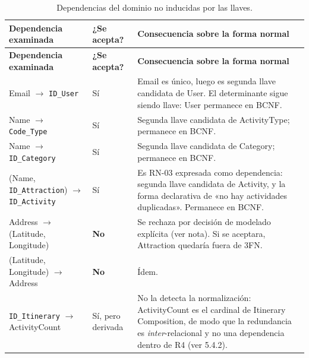 \documentclass[11pt,a4paper]{article}
\begin{document}
{\footnotesize\setlength{\tabcolsep}{3pt}\renewcommand{\arraystretch}{1.15}
\begin{longtable}{|>{\raggedright\arraybackslash}p{4.68cm}|>{\raggedright\arraybackslash}p{1.88cm}|>{\raggedright\arraybackslash}p{8.78cm}|}
\caption{Dependencias del dominio no inducidas por las llaves.}\label{tab:dominio}\\ \hline
\rowcolor{gray!20} \textbf{Dependencia examinada} & \textbf{¿Se acepta?} & \textbf{Consecuencia sobre la forma normal} \\ \hline
\endfirsthead
\hline \rowcolor{gray!20} \textbf{Dependencia examinada} & \textbf{¿Se acepta?} & \textbf{Consecuencia sobre la forma normal} \\ \hline
\endhead
Email \ensuremath{\rightarrow} \texttt{ID\_User} & Sí & Email es único, luego es segunda llave candidata de User. El determinante sigue siendo llave: User permanece en BCNF. \\ \hline
Name \ensuremath{\rightarrow} \texttt{Code\_Type} & Sí & Segunda llave candidata de ActivityType; permanece en BCNF. \\ \hline
Name \ensuremath{\rightarrow} \texttt{ID\_Category} & Sí & Segunda llave candidata de Category; permanece en BCNF. \\ \hline
(Name, \texttt{ID\_Attraction}) \ensuremath{\rightarrow} \texttt{ID\_Activity} & Sí & Es RN-03 expresada como dependencia: segunda llave candidata de Activity, y la forma declarativa de «no hay actividades duplicadas». Permanece en BCNF. \\ \hline
Address \ensuremath{\rightarrow} (Latitude, Longitude) & \textbf{No} & Se rechaza por decisión de modelado explícita (ver nota). Si se aceptara, Attraction quedaría fuera de 3FN. \\ \hline
(Latitude, Longitude) \ensuremath{\rightarrow} Address & \textbf{No} & Ídem. \\ \hline
\texttt{ID\_Itinerary} \ensuremath{\rightarrow} ActivityCount & Sí, pero derivada & No la detecta la normalización: ActivityCount es el cardinal de Itinerary Composition, de modo que la redundancia es \textit{inter}-relacional y no una dependencia dentro de R4 (ver 5.4.2). \\ \hline
\end{longtable}}
\vspace{2pt}
\end{document}
